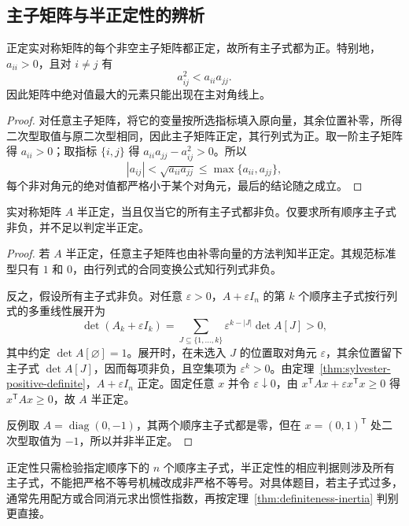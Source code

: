 \subsection{主子矩阵与半正定性的辨析}

\begin{proposition}
\label{prop:positive-definite-principal-submatrices}
正定实对称矩阵的每个非空主子矩阵都正定，故所有主子式都为正。特别地，$a_{ii}>0$，且对 $i\ne j$ 有
\begin{equation}
\label{eq:positive-definite-entry-bound}
    a_{ij}^2<a_{ii}a_{jj}.
\end{equation}
因此矩阵中绝对值最大的元素只能出现在主对角线上。
\end{proposition}
\begin{proof}
对任意主子矩阵，将它的变量按所选指标填入原向量，其余位置补零，所得二次型取值与原二次型相同，因此主子矩阵正定，其行列式为正。取一阶主子矩阵得 $a_{ii}>0$；取指标 $\{i,j\}$ 得 $a_{ii}a_{jj}-a_{ij}^2>0$。所以
\[
    |a_{ij}|<\sqrt{a_{ii}a_{jj}}\leq\max\{a_{ii},a_{jj}\},
\]
每个非对角元的绝对值都严格小于某个对角元，最后的结论随之成立。
\end{proof}

\begin{proposition}
\label{prop:semidefinite-all-principal-minors}
实对称矩阵 $A$ 半正定，当且仅当它的所有主子式都非负。仅要求所有顺序主子式非负，并不足以判定半正定。
\end{proposition}
\begin{proof}
若 $A$ 半正定，任意主子矩阵也由补零向量的方法判知半正定。其规范标准型只有 $1$ 和 $0$，由行列式的合同变换公式知行列式非负。

反之，假设所有主子式非负。对任意 $\varepsilon>0$，$A+\varepsilon I_n$ 的第 $k$ 个顺序主子式按行列式的多重线性展开为
\[
    \det(A_k+\varepsilon I_k)
      =\sum_{J\subseteq\{1,\ldots,k\}}
          \varepsilon^{k-|J|}\det A[J]>0,
\]
其中约定 $\det A[\varnothing]=1$。展开时，在未选入 $J$ 的位置取对角元 $\varepsilon$，其余位置留下主子式 $\det A[J]$，因而每项非负，且空集项为 $\varepsilon^k>0$。由定理~\ref{thm:sylvester-positive-definite}，$A+\varepsilon I_n$ 正定。固定任意 $x$ 并令 $\varepsilon\downarrow0$，由 $x^{\mathsf T}Ax+\varepsilon x^{\mathsf T}x\geq0$ 得 $x^{\mathsf T}Ax\geq0$，故 $A$ 半正定。

反例取 $A=\operatorname{diag}(0,-1)$，其两个顺序主子式都是零，但在 $x=(0,1)^{\mathsf T}$ 处二次型取值为 $-1$，所以并非半正定。
\end{proof}

正定性只需检验指定顺序下的 $n$ 个顺序主子式，半正定性的相应判据则涉及所有主子式，不能把严格不等号机械改成非严格不等号。对具体题目，若主子式过多，通常先用配方或合同消元求出惯性指数，再按定理~\ref{thm:definiteness-inertia} 判别更直接。

